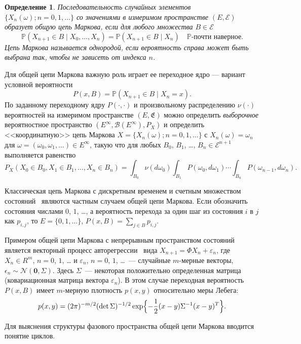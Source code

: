 \documentclass[14pt]{extarticle}
\newtheorem{definition}{Определение}
\renewcommand{\Pr}{\mathbb P}
\begin{document}
\begin{definition}{\cite{Shyr}}
  Последовательность случайных элементов $\{X_n(\omega); n=0, 1, \ldots\}$ со
  значениями в измеримом пространстве $(E, \mathcal E)$ образует общую цепь
  Маркова, если для любого множества $B\in\mathcal E$ 
  \[
  \Pr(X_{n+1}\in B \mid X_0, \ldots, X_n) = \Pr(X_{n+1}\in B \mid X_n) \quad
  \text{$\Pr$-почти наверное}.
  \]
  Цепь Маркова называется однородой, если вероятность справа может быть выбрана
  так, чтобы не зависеть от индекса $n$.
\end{definition}


Для общей цепи Маркова важную роль играет ее переходное ядро --- вариант
условной вероятности 
\[
P(x,B) = \Pr(X_{n+1}\in B \mid X_n=x).
\]
По заданному переходному ядру $P(\cdot, \cdot)$ и произвольному распределению
$\nu(\cdot)$ вероятностей на измеримом пространстве $(E, \mathfrak E)$ можно
определить \emph{выборочное} вероятностное пространство $(E^\infty, \mathcal
B(E^\infty), P_X)$ и определить <<координатную>> цепь Маркова $X=\{X_n(\omega);
n=0, 1, \ldots\}$ с $X_n(\omega)=\omega_n$ для $\omega=(\omega_0, \omega_1,
\ldots)\in E^\infty$, такую что для любых $B_0$, $B_1$, \ldots, $B_n\in \mathcal
E^{n+1}$ выполняется равенство
\[
P_X(X_0\in B_0, X_1\in B_1, \ldots, X_n\in B_n)=\int_{B_0} \nu(d\omega_0)
\int_{B_1} P(\omega_0, d\omega_1) \cdots \int_{B_n} P(\omega_{n-1}, d\omega_n).
\]

Классическая цепь Маркова с дискретным временем и счетным множеством состояний~\cite{Kemeni:Snell}
являются частным случаем общей цепи Маркова. Если обозначить состояния числами
$0$, $1$, \ldots, а вероятность перехода за один шаг из состояния $i$ в $j$ как
$p_{i,j}$, то $E=\{0, 1, \ldots\}$, $P(x,B)=\sum_{j\in B} p_{i,j}$. 

Примером общей цепи Маркова с непрерывным пространством состояний является
векторный процесс авторегрессии~\cite{Hamilton} вида $X_{n+1}=\Phi X_n+\varepsilon_{n}$, где $X_n\in
R^m$, $n=0$, $1$, \ldots{} и $\varepsilon_n$, $n=0$, $1$, \ldots{}~--- случайные
$m$-мерные векторы, $\epsilon_n \sim \mathcal N(\mathbf 0, \Sigma)$. Здесь
$\Sigma$~--- некоторая положительно определенная матрица (ковариационная матрица
вектора $\varepsilon_n$). В этом случае переходная вероятность $P(x,B)$ имеет
$m$-мерную плотность $p(x,y)$ относительно меры Лебега:
\[
p(x,y)=(2\pi)^{-m/2}(\det \Sigma)^{-1/2} \exp\Bigl\{-\frac12 (x-y) \Sigma^{-1}
(x-y)^T\Bigr\}.
\]



Для выяснения структуры фазового пространства общей цепи Маркова вводится
понятие циклов.
\end{document}
